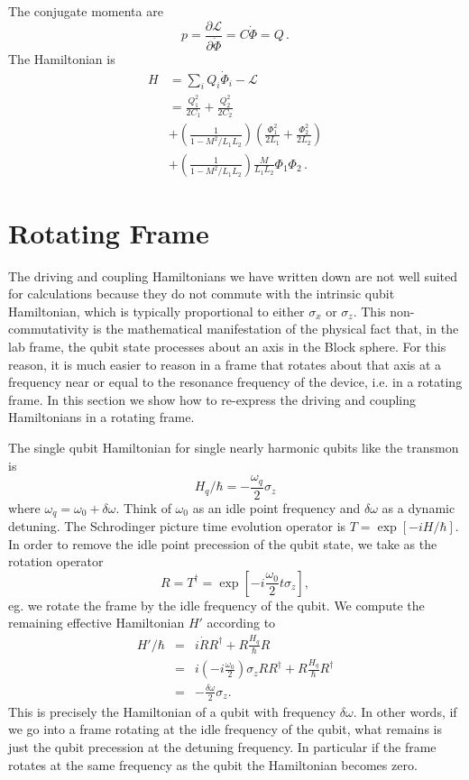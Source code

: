 The conjugate momenta are
\begin{equation}
p = \frac{\partial \mathcal{L}}{\partial \dot{\Phi}} = C \dot{\Phi} = Q \, .
\end{equation}
The Hamiltonian is
\begin{align}
H &= \sum_i Q_i \dot{\Phi}_i - \mathcal{L} \\
&= \frac{Q_1^2}{2 C_1} + \frac{Q_2^2}{2 C_2} \\
&+ \left( \frac{1}{1 - M^2 / L_1L_2} \right)
\left( \frac{\Phi_1^2}{2L_1} + \frac{\Phi_2^2}{2L_2} \right) \\
&+ \left( \frac{1}{1 - M^2 / L_1 L_2} \right) \frac{M}{L_1 L_2} \Phi_1 \Phi_2 \, .
\end{align}


\section{Rotating Frame}

The driving and coupling Hamiltonians we have written down are not well suited for calculations because they do not commute with the intrinsic qubit Hamiltonian, which is typically proportional to either $\sigma_x$ or $\sigma_z$.
This non-commutativity is the mathematical manifestation of the physical fact that, in the lab frame, the qubit state processes about an axis in the Block sphere.
For this reason, it is much easier to reason in a frame that rotates about that axis at a frequency near or equal to the resonance frequency of the device, i.e. in a rotating frame.
In this section we show how to re-express the driving and coupling Hamiltonians in a rotating frame.

The single qubit Hamiltonian for single nearly harmonic qubits like the transmon is \begin{equation}
H_q/\hbar = -\frac{\omega_q}{2}\sigma_z \end{equation}
where $\omega_q = \omega_0 + \delta\omega$. Think of $\omega_0$ as an idle point frequency and $\delta \omega$ as a dynamic detuning.
The Schrodinger picture time evolution operator is $T=\exp \left[-i H/\hbar \right]$.
In order to remove the idle point precession of the qubit state, we take as the rotation operator \begin{equation}
R = T^{\dagger} = \exp \left[ -i \frac{\omega_0}{2} t \sigma_z \right], \end{equation}
eg. we rotate the frame by the idle frequency of the qubit.
We compute the remaining effective Hamiltonian $H'$ according to  \begin{eqnarray}
H'/\hbar &=& i\dot{R}R^{\dagger} + R \frac{H_q}{\hbar} R \\
&=& i \left(-i \frac{\omega_0}{2} \right)\sigma_z RR^{\dagger} + R\frac{H_q}{\hbar}R^{\dagger} \\
&=& -\frac{\delta\omega}{2}\sigma_z. \end{eqnarray}
This is precisely the Hamiltonian of a qubit with frequency $\delta\omega$.
In other words, if we go into a frame rotating at the idle frequency of the qubit, what remains is just the qubit precession at the detuning frequency.
In particular if the frame rotates at the same frequency as the qubit the Hamiltonian becomes zero.


